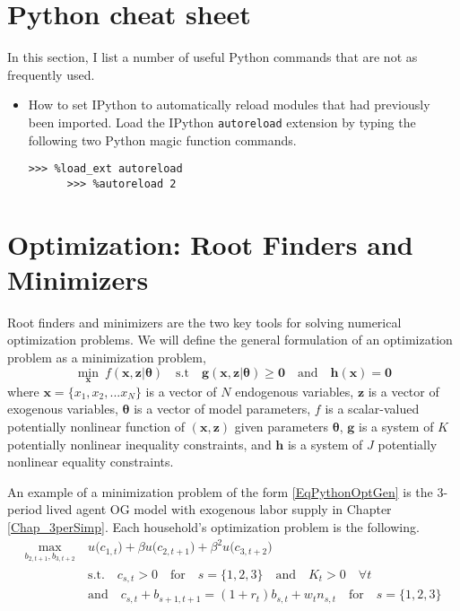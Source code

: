\section{Python cheat sheet}\label{SecPythonCheat}

  In this section, I list a number of useful Python commands that are not as frequently used.
  \begin{itemize}
    \item How to set IPython to automatically reload modules that had previously been imported. Load the IPython \texttt{autoreload} extension by typing the following two Python magic function commands.
    \begin{lstlisting}[frame=single]
      >>> %load_ext autoreload
      >>> %autoreload 2
    \end{lstlisting}
  \end{itemize}


\section{Optimization: Root Finders and Minimizers}\label{SecPythonOpt}

  Root finders and minimizers are the two key tools for solving numerical optimization problems. We will define the general formulation of an optimization problem as a minimization problem,
  \begin{equation}\label{EqPythonOptGen}
    \min_{\bm{x}}\: f\left(\bm{x},\bm{z}|\bm{\theta}\right) \quad\text{s.t}\quad \bm{g}(\bm{x},\bm{z}|\bm{\theta})\geq\bm{0} \quad\text{and}\quad \bm{h}(\bm{x}) = \bm{0}
  \end{equation}
  where $\bm{x}=\{x_1, x_2,... x_N\}$ is a vector of $N$ endogenous variables, $\bm{z}$ is a vector of exogenous variables, $\bm{\theta}$ is a vector of model parameters, $f$ is a scalar-valued potentially nonlinear function of $(\bm{x},\bm{z})$ given parameters $\bm{\theta}$, $\bm{g}$ is a system of $K$ potentially nonlinear inequality constraints, and $\bm{h}$ is a system of $J$ potentially nonlinear equality constraints.

  An example of a minimization problem of the form \eqref{EqPythonOptGen} is the 3-period lived agent OG model with exogenous labor supply in Chapter \ref{Chap_3perSimp}. Each household's optimization problem is the following.
  \begin{equation}\label{EqPython3perProb}
    \begin{split}
      \max_{b_{2,t+1},b_{3,t+2}}\: &u\bigl(c_{1,t}\bigr) + \beta u\bigl(c_{2,t+1}\bigr) + \beta^2 u\bigl(c_{3,t+2}\bigr) \\
      &\text{s.t.}\quad c_{s,t} > 0 \quad\text{for}\quad s = \{1,2,3\} \quad\text{and}\quad K_t > 0 \quad\forall t \\
      &\text{and}\quad c_{s,t} + b_{s+1,t+1} = (1+r_t)b_{s,t} + w_t n_{s,t} \quad\text{for}\quad s = \{1,2,3\}
    \end{split}
  \end{equation}

